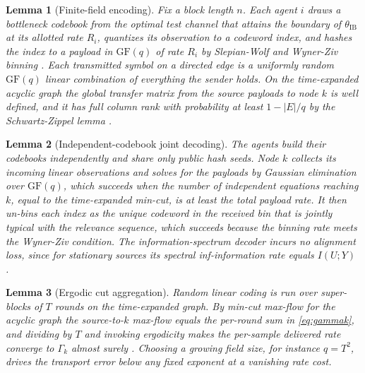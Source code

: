 \documentclass[journal]{IEEEtran}
\newtheorem{lemma}{Lemma}
\theoremstyle{definition}
\theoremstyle{remark}
\newcommand{\tib}{\theta_{\mathrm{IB}}}
\newcommand{\Gk}{\Gamma_k}
\begin{document}
\begin{lemma}[Finite-field encoding]\label{lem:encode}
Fix a block length $n$. Each agent $i$ draws a bottleneck codebook from the optimal test channel that attains the
boundary of $\tib$ at its allotted rate $R_i$, quantizes its observation to a codeword index, and hashes the
index to a payload in $\mathrm{GF}(q)$ of rate $R_i$ by Slepian-Wolf and Wyner-Ziv binning
\cite{slepianwolf1973,wynerziv1976,berger1978}. Each transmitted symbol on a directed edge is a uniformly random
$\mathrm{GF}(q)$ linear combination of everything the sender holds. On the time-expanded acyclic graph the global
transfer matrix from the source payloads to node $k$ is well defined, and it has full column rank with probability
at least $1-|E|/q$ by the Schwartz-Zippel lemma \cite{schwartz1980,zippel1979,ho2006}.
\end{lemma}

\begin{lemma}[Independent-codebook joint decoding]\label{lem:decode}
The agents build their codebooks independently and share only public hash seeds. Node $k$ collects its incoming
linear observations and solves for the payloads by Gaussian elimination over $\mathrm{GF}(q)$, which succeeds when
the number of independent equations reaching $k$, equal to the time-expanded min-cut, is at least the total
payload rate. It then un-bins each index as the unique codeword in the received bin that is jointly typical with
the relevance sequence, which succeeds because the binning rate meets the Wyner-Ziv condition. The
information-spectrum decoder incurs no alignment loss, since for stationary sources its spectral inf-information
rate equals $I(U;Y)$ \cite{han2003,verduhan1994}.
\end{lemma}

\begin{lemma}[Ergodic cut aggregation]\label{lem:aggregate}
Random linear coding is run over super-blocks of $T$ rounds on the time-expanded graph. By min-cut max-flow for
the acyclic graph the source-to-$k$ max-flow equals the per-round sum in \eqref{eq:gammak}, and dividing by $T$
and invoking ergodicity makes the per-sample delivered rate converge to $\Gk$ almost surely
\cite{aclY2000,liyeungcai2003}. Choosing a growing field size, for instance $q=T^2$, drives the transport error
below any fixed exponent at a vanishing rate cost.
\end{lemma}
\end{document}
